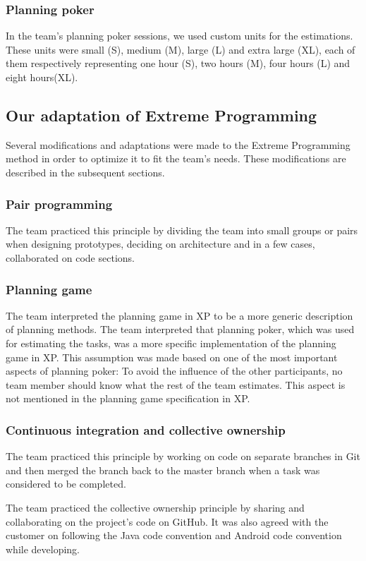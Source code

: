 \subsubsection{Planning poker}
In the team's planning poker sessions, we used custom units for the estimations. These units were small (S), medium (M), large (L) and extra large (XL), each of them respectively representing one hour (S), two hours (M), four hours (L) and eight hours(XL).

\subsection{Our adaptation of Extreme Programming}
\label{sec:adapExtremeProgr}
Several modifications and adaptations were made to the Extreme Programming method in order to optimize it to fit the team's needs. These modifications are described in the subsequent sections.

\subsubsection{Pair programming}
The team practiced this principle by dividing the team into small groups or pairs when designing prototypes, deciding on architecture and in a few cases, collaborated on code sections.

\subsubsection{Planning game}
The team interpreted the planning game in XP to be a more generic description of planning methods. The team interpreted that planning poker, which was used for estimating the tasks, was a more specific implementation of the planning game in XP. This assumption was made based on one of the most important aspects of planning poker: To avoid the influence of the other participants, no team member should know what the rest of the team estimates. This aspect is not mentioned in the planning game specification in XP.

\subsubsection{Continuous integration and collective ownership}
The team practiced this principle by working on code on separate branches in Git and then merged the branch back to the master branch when a task was considered to be completed.

The team practiced the collective ownership principle by sharing and collaborating on the project's code on GitHub. It was also agreed with the customer on following the Java code convention and Android code convention while developing.

